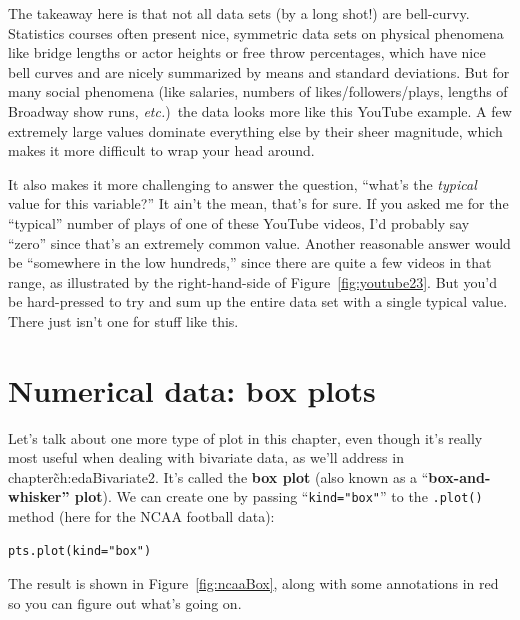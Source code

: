 
The takeaway here is that not all data sets (by a long shot!) are bell-curvy.
Statistics courses often present nice, symmetric data sets on physical
phenomena like bridge lengths or actor heights or free throw percentages, which
have nice bell curves and are nicely summarized by means and standard
deviations. But for many social phenomena (like salaries, numbers of
likes/followers/plays, lengths of Broadway show runs, \textit{etc.})~the data
looks more like this YouTube example. A few extremely large values dominate
everything else by their sheer magnitude, which makes it more difficult to wrap
your head around.

It also makes it more challenging to answer the question, ``what's the
\textit{typical} value for this variable?'' It ain't the mean, that's for sure.
If you asked me for the ``typical'' number of plays of one of these YouTube
videos, I'd probably say ``zero'' since that's an extremely common value.
Another reasonable answer would be ``somewhere in the low hundreds,'' since
there are quite a few videos in that range, as illustrated by the
right-hand-side of Figure~\ref{fig:youtube23}. But you'd be hard-pressed to try
and sum up the entire data set with a single typical value. There just isn't
one for stuff like this.

\section{Numerical data: box plots}


Let's talk about one more type of plot in this chapter, even though it's really
most useful when dealing with bivariate data, as we'll address in
chapter\~{ch:edaBivariate2}. It's called the \textbf{box plot} (also known as a
``\textbf{box-and-whisker'' plot}). We can create one by passing
``\texttt{kind="box"}'' to the \texttt{.plot()} method (here for the NCAA
football data):

\begin{Verbatim}[fontsize=\small,samepage=true,frame=single,framesep=3mm]
pts.plot(kind="box")
\end{Verbatim}

\label{interpretingBoxPlots}

The result is shown in Figure~\ref{fig:ncaaBox}, along with some annotations in
red so you can figure out what's going on.

